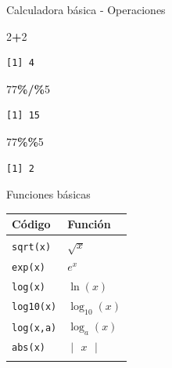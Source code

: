 \documentclass[
  ignorenonframetext,
]{beamer}
\newenvironment{Shaded}{\begin{snugshade}}{\end{snugshade}}
\newcommand{\DecValTok}[1]{\textcolor[rgb]{0.00,0.00,0.81}{#1}}
\newcommand{\SpecialCharTok}[1]{\textcolor[rgb]{0.81,0.36,0.00}{\textbf{#1}}}
\begin{document}
\begin{frame}[fragile]{Calculadora básica - Operaciones}
\label{calculadora-buxe1sica---operaciones-1}
\begin{Shaded}
\begin{Highlighting}[]
\DecValTok{2}\SpecialCharTok{+}\DecValTok{2}
\end{Highlighting}
\end{Shaded}

\begin{verbatim}
[1] 4
\end{verbatim}

\begin{Shaded}
\begin{Highlighting}[]
\DecValTok{77}\SpecialCharTok{\%/\%}\DecValTok{5}
\end{Highlighting}
\end{Shaded}

\begin{verbatim}
[1] 15
\end{verbatim}

\begin{Shaded}
\begin{Highlighting}[]
\DecValTok{77}\SpecialCharTok{\%\%}\DecValTok{5}
\end{Highlighting}
\end{Shaded}

\begin{verbatim}
[1] 2
\end{verbatim}
\end{frame}

\begin{frame}[fragile]{Funciones básicas}
\label{funciones-buxe1sicas}
\begin{longtable}[]{@{}ll@{}}
\toprule\noalign{}
Código & Función \\
\midrule\noalign{}
\endhead
\texttt{sqrt(x)} & \(\sqrt{x}\) \\
\texttt{exp(x)} & \(e^x\) \\
\texttt{log(x)} & \(\ln(x)\) \\
\texttt{log10(x)} & \(\log_{10}(x)\) \\
\texttt{log(x,a)} & \(\log_a(x)\) \\
\texttt{abs(x)} & \(\begin{vmatrix}x\end{vmatrix}\) \\
\bottomrule\noalign{}
\end{longtable}
\end{frame}
\end{document}
